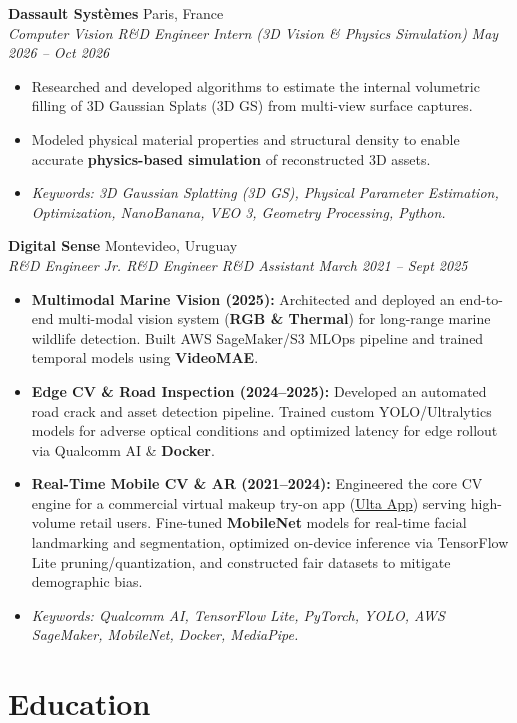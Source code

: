 \documentclass[10pt, a4paper]{article}
\newcommand{\entryheader}[4]{
    \noindent \textbf{#1} \hfill #2 \\
    \textit{#3} \hfill \textit{#4} \vspace{0pt}
}
\begin{document}
\entryheader{Dassault Systèmes}{Paris, France}{Computer Vision R\&D Engineer Intern (3D Vision \& Physics Simulation)}{May 2026 -- Oct 2026}
\begin{itemize}
    \item Researched and developed algorithms to estimate the internal volumetric filling of 3D Gaussian Splats (3D GS) from multi-view surface captures.
    \item Modeled physical material properties and structural density to enable accurate \textbf{physics-based simulation} of reconstructed 3D assets.
    \item \textit{Keywords: 3D Gaussian Splatting (3D GS), Physical Parameter Estimation, Optimization, NanoBanana, VEO 3, Geometry Processing, Python.}
\end{itemize}
\vspace{3pt}

\entryheader{Digital Sense}{Montevideo, Uruguay}{R\&D Engineer \textbar{} Jr. R\&D Engineer \textbar{} R\&D Assistant}{March 2021 -- Sept 2025}
\begin{itemize}
    \item \textbf{Multimodal Marine Vision (2025):} Architected and deployed an end-to-end multi-modal vision system (\textbf{RGB \& Thermal}) for long-range marine wildlife detection. Built AWS SageMaker/S3 MLOps pipeline and trained temporal models using \textbf{VideoMAE}.
    \item \textbf{Edge CV \& Road Inspection (2024--2025):} Developed an automated road crack and asset detection pipeline. Trained custom YOLO/Ultralytics models for adverse optical conditions and optimized latency for edge rollout via Qualcomm AI \& \textbf{Docker}.
    \item \textbf{Real-Time Mobile CV \& AR (2021--2024):} Engineered the core CV engine for a commercial virtual makeup try-on app (\href{https://www.ulta.com/company/app?srsltid=AfmBOorrV_A9GKMtuqNiCTeg1_JPuXVPm-JVckez5tHgEYyQP1o90QxV}{Ulta App}) serving high-volume retail users. Fine-tuned \textbf{MobileNet} models for real-time facial landmarking and segmentation, optimized on-device inference via TensorFlow Lite pruning/quantization, and constructed fair datasets to mitigate demographic bias.
    \item \textit{Keywords: Qualcomm AI, TensorFlow Lite, PyTorch, YOLO, AWS SageMaker, MobileNet, Docker, MediaPipe.}
\end{itemize}

\section{Education}
\end{document}
